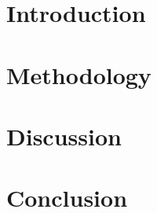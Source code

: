 \section{Introduction}
\lipsum[2] \cite{sample}
\section{Methodology}
\lipsum[3]
\section{Discussion}
\lipsum[4]
\section{Conclusion}
\lipsum[5]